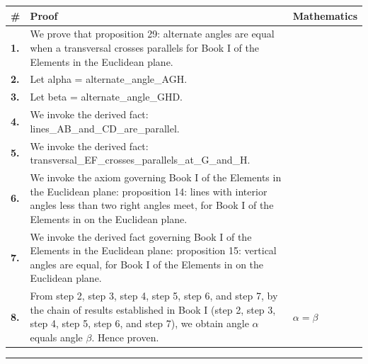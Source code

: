 \documentclass[11pt]{article}
\theoremstyle{definition}
\begin{document}
\begin{tabular}{@{} >{\raggedright\arraybackslash}p{} >{\raggedright\arraybackslash}p{} >{\raggedleft\arraybackslash}p{} @{}}
\textbf{\#} & \textbf{Proof} & \textbf{Mathematics} \\
\midrule
\textbf{1.} & We prove that proposition 29: alternate angles are equal when a transversal crosses parallels for Book I of the Elements in the Euclidean plane. & \\[0.45em]
\textbf{2.} & Let alpha = alternate\_angle\_AGH. & \\[0.45em]
\textbf{3.} & Let beta = alternate\_angle\_GHD. & \\[0.45em]
\textbf{4.} & We invoke the derived fact: lines\_AB\_and\_CD\_are\_parallel. & \\[0.45em]
\textbf{5.} & We invoke the derived fact: transversal\_EF\_crosses\_parallels\_at\_G\_and\_H. & \\[0.45em]
\textbf{6.} & We invoke the axiom governing Book I of the Elements in the Euclidean plane: proposition 14: lines with interior angles less than two right angles meet, for Book I of the Elements in on the Euclidean plane. & \\[0.45em]
\textbf{7.} & We invoke the derived fact governing Book I of the Elements in the Euclidean plane: proposition 15: vertical angles are equal, for Book I of the Elements in on the Euclidean plane. & \\[0.45em]
\textbf{8.} & From step 2, step 3, step 4, step 5, step 6, and step 7, by the chain of results established in Book I (step 2, step 3, step 4, step 5, step 6, and step 7), we obtain angle $\alpha$ equals angle $\beta$. Hence proven. & $\displaystyle \alpha = \beta$ \\[0.45em]
\bottomrule
\end{tabular}
\label{thm:Geometry-Euclid Book I-proposition_29_alternate_angles_are_equal_when_a_transversal_crosses_parallels}
\par\medskip\hrule
\end{document}
